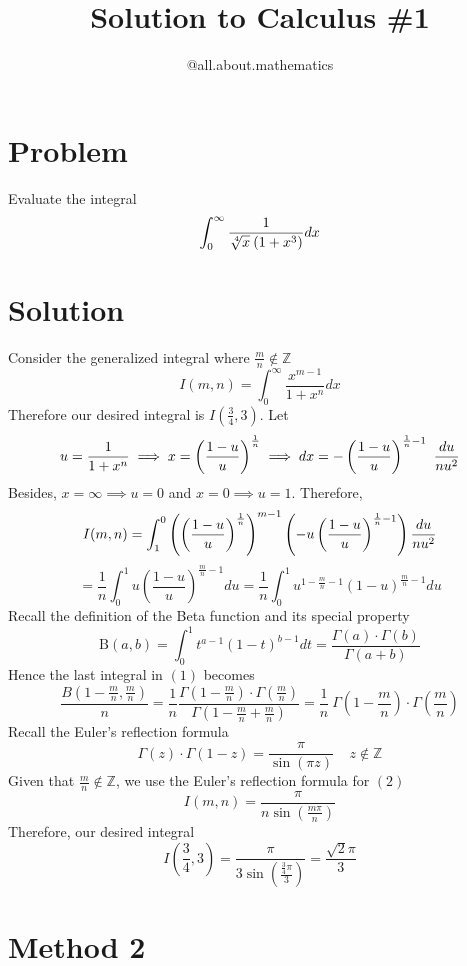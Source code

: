 \documentclass[10pt]{article}
\title{\Huge{Solution to Calculus \#1}}
\author{@all.about.mathematics}
\begin{document}
\large
\maketitle
\pagecolor{black}
\section{Problem}
Evaluate the integral 
$$\int_{0}^{\infty}\frac{1}{{\sqrt[\leftroot{-1}\uproot{1}4]{x}}\:(1+x^3)}dx$$
\newpage
\section{Solution}
Consider the generalized integral where $\frac m n \not \in \mathbb{Z}$
$$I(m,n)=\int_{0}^{\infty}\frac{x^{m-1}}{1+x^n}dx$$
Therefore our desired integral is $I(\frac{3}{4},3)$. Let
$$u=\frac{1}{1+x^n}\implies x=\left(\frac{1-u}{u}\right)^\frac{1}{n}\implies dx=-\left(\dfrac{1-u}{u}\right)^{\large\frac1n-1}\ \dfrac{du}{nu^2}$$
Besides, $x=\infty\implies u=0$ and $x=0\implies u=1$. Therefore,
$$I(m,n)=\int_{1}^{0}\left({\left(\frac{1-u}{u}\right)^\frac{1}{n}}\right)^{m-1}\left(-u\left(\dfrac{1-u}{u}\right)^{\large\frac1n-1}\right) \dfrac{du}{nu^2}$$
\begin{equation}
=\frac1n \int_{0}^{1}u{\left(\frac{1-u}{u}\right)^{\frac{m}{n}-1}}{du}=\frac1n\int_0^1u^{1-\frac{m}{n}-1}(1-u)^{\frac{m}{n}-1} du
\end{equation}
Recall the definition of the Beta function and its special property
$$\text{B}(a,b)=\int_0^1t^{a-1}(1-t)^{b-1} dt=\frac{\Gamma(a)\cdot\Gamma(b)}{\Gamma(a+b)}$$
Hence the last integral in $(1)$ becomes
\begin{equation}
\frac{ B\left(1-\frac mn , \frac m n\right)}{n}= \frac 1 n \frac{\Gamma(1-\frac mn)\cdot\Gamma(\frac m n)}{\Gamma(1-\frac mn + \frac m n)} = \frac 1 n\: \Gamma\left(1-\frac mn\right)\cdot\Gamma\left(\frac m n\right) 
\end{equation}
Recall the Euler's reflection formula 
$$\Gamma(z)\cdot\Gamma(1-z)=\frac{\pi}{\sin(\pi z)}\:\:\:\:\: z\not\in\mathbb{Z}$$
Given that $\frac m n \not\in \mathbb{Z}$, we use the Euler's reflection formula for $(2)$
$$I(m,n)= \frac{\pi}{n \sin(\frac {m\pi}{n} )}$$
Therefore, our desired integral 
$$I\left(\frac{3}{4},3\right)= \frac{\pi}{3 \sin \left(\frac {\frac 3 4\pi}{3}\right)}= \frac{\sqrt{2}\pi}{3}$$
\newpage
\section{Method 2}
\end{document}
